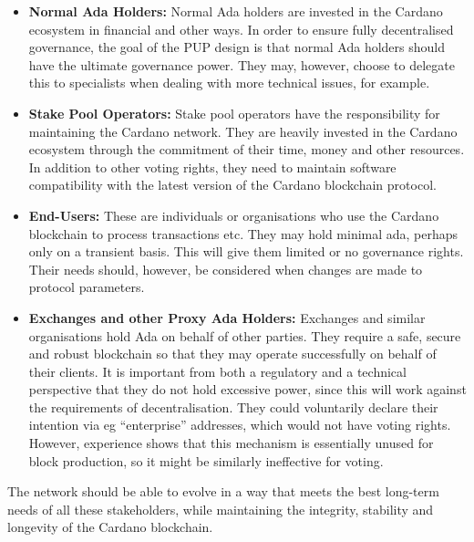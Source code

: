 \begin{itemize}
\item
  \textbf{Normal Ada Holders:}
  Normal Ada holders are invested in the Cardano ecosystem in financial and other ways.
   In order to ensure fully decentralised governance, the goal of the PUP design is that normal Ada holders should have the ultimate governance power. They may, however, choose to delegate this to specialists when dealing with more technical issues, for example.
  \item
  \textbf{Stake Pool Operators:}
  Stake pool operators have the responsibility for maintaining the Cardano network.  They are heavily invested in the Cardano ecosystem through the commitment of their time, money and other resources.
  In addition to other voting rights, they need to maintain software compatibility with the latest version of the Cardano blockchain protocol.
  \item
  \textbf{End-Users:}
  These are individuals or organisations who use the Cardano blockchain to process transactions etc.  They may hold minimal ada, perhaps only on a transient basis.
  This will give them limited or no governance rights.  Their needs should, however, be considered when changes are made to protocol parameters.
  \item
  \textbf{Exchanges and other Proxy Ada Holders:}
  Exchanges and similar organisations hold Ada on behalf of other parties.  They require a safe, secure and robust blockchain so that they may operate successfully on
  behalf of their clients.  It is important from both a regulatory and a technical perspective that they do not hold excessive
  power, since this will work against the requirements of decentralisation.
  They could voluntarily declare their intention via eg ``enterprise'' addresses, which would not have voting rights. However, experience shows that this mechanism is essentially unused for block production, so it might be similarly ineffective for voting.
\end{itemize}

The network should be able to evolve in a way that meets the best long-term needs of all these stakeholders, while maintaining the integrity, stability and longevity of
the Cardano blockchain.
